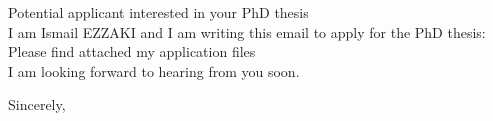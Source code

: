 \documentclass[24pt]{article}
\title{}
\author{}
\begin{document}
Potential applicant interested in your PhD thesis
\newline
\newline
\newline
\dearauthor \\

I am Ismail EZZAKI and I am writing this email to apply for the PhD thesis: \thesis
\\ 
Please find attached my application files
\\

I am looking forward to hearing from you soon.

Sincerely,

	
\end{document}
